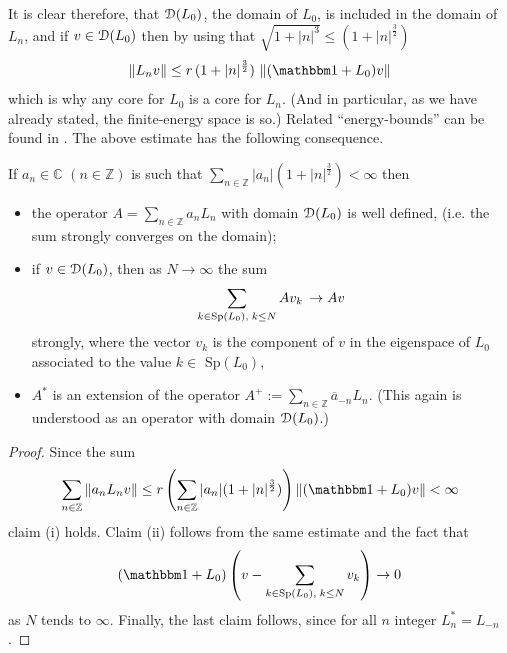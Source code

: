 \documentclass[12pt]{article}
\begin{document}
It is clear therefore, that ${\mathcal D}(L_0)$, the domain of $L_0$, is included 
in the domain of $L_n$, and if $v \in {\mathcal D}(L_0)$ then by using that
$\sqrt{1+|n|^3}\leq (1+|n|^{\frac{3}{2}})$
\begin{equation}
\label{energybound}
\|L_n v\| \leq r \,(1+|n|^{\frac{3}{2}})\,\,\|(\mathbbm 1 +L_0)v\|
\end{equation}
which is why any core for $L_0$ is a core for $L_n$. (And in particular,
as we have already stated, the finite-energy space is so.)
Related ``energy-bounds'' can be found in \cite{BS-M}. 
The above estimate has the following consequence. 
\begin{proposition}
\label{AonD}
If $a_n \in {\mathbb C} \,\, (n \in {\mathbb Z})$ is such that
$\mathop{\sum}_{n \in {\mathbb Z}}|a_n| (1+|n|^{\frac{3}{2}}) < \infty$ then 
\begin{itemize}
\item[(i)]
the operator $A=\mathop{\sum}_{n \in {\mathbb Z}}a_n L_n$ 
with domain ${\mathcal D}(L_0)$ is well defined, 
(i.e. the sum strongly converges on the domain);

\item[(ii)]
if $v \in {\mathcal D}(L_0)$, then as 
$N \rightarrow \infty$ the sum 
$$\mathop{\sum}_{k \in {\rm Sp}(L_0), \; k \leq N} A v_k \, 
\rightarrow A v $$ strongly, 
where the vector $v_k$ is the component of $v$ in the eigenspace of $L_0$
associated to the value $k \in $ Sp$(L_0)$,
\item[(iii)]
$A^*$ is an extension of the operator
$A^+:=\mathop{\sum}_{n \in {\mathbb Z}}\overline{a}_{-n} L_n$. 
(This again is understood as an operator with domain ${\mathcal D}(L_0)$.)
\end{itemize}  
\end{proposition}
\begin{proof}
Since the sum
\begin{equation}
\label{domain}
\mathop{\sum}_{n \in {\mathbb Z}} \|a_n L_n v\|
\leq
r \left( \mathop{\sum}_{n \in {\mathbb Z}} 
 |a_n| (1+|n|^{\frac{3}{2}}) \right) \|(\mathbbm 1 +L_0)v\| < \infty 
\end{equation}
claim (i) holds. 
Claim (ii) follows from the same estimate and the fact that
$$(\mathbbm 1+L_0)\left( v - \mathop{\sum}_{k \in {\rm Sp}(L_0),
\; k \leq N} v_k \right) \rightarrow 0$$ 
as $N$ tends to $\infty$.
Finally, the last claim follows,
since for all $n$ integer $L_n^*=L_{-n}$.
\end{proof}
\end{document}

